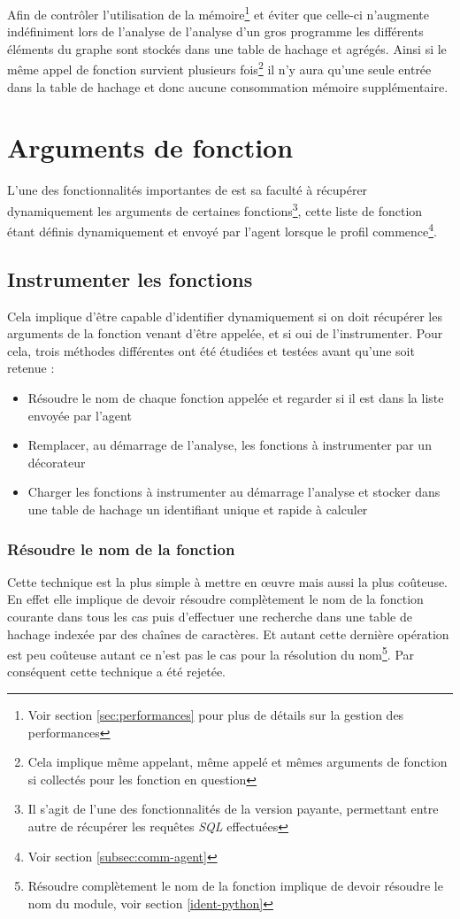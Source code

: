 \begin{note}
Afin de contrôler l'utilisation de la mémoire\footnote{Voir section \vref{sec:performances} pour plus de détails sur la gestion des performances} et éviter que celle-ci n'augmente indéfiniment lors de l'analyse de l'analyse d'un gros programme les différents éléments du graphe sont stockés dans une table de hachage et agrégés. Ainsi si le même appel de fonction survient plusieurs fois\footnote{Cela implique même appelant, même appelé et mêmes arguments de fonction si collectés pour les fonction en question} il n'y aura qu'une seule entrée dans la table de hachage et donc aucune consommation mémoire supplémentaire.
\end{note}

  \section{Arguments de fonction}
  \label{sec:fnargs}
L'une des fonctionnalités importantes de \Blackfire est sa faculté à récupérer dynamiquement les arguments de certaines fonctions\footnote{Il s'agit de l'une des fonctionnalités de la version payante, permettant entre autre de récupérer les requêtes \emph{SQL} effectuées}, cette liste de fonction étant définis dynamiquement et envoyé par l'agent lorsque le profil commence\footnote{Voir section \vref{subsec:comm-agent}}.

\subsection{Instrumenter les fonctions}
Cela implique d'être capable d'identifier dynamiquement si on doit récupérer les arguments de la fonction venant d'être appelée, et si oui de l'instrumenter. Pour cela, trois méthodes différentes ont été étudiées et testées avant qu'une soit retenue : 
\begin{itemize}
\item Résoudre le nom de chaque fonction appelée et regarder si il est dans la liste envoyée par l'agent
\item Remplacer, au démarrage de l'analyse, les fonctions à instrumenter par un décorateur
\item Charger les fonctions à instrumenter au démarrage l'analyse et stocker dans une table de hachage un identifiant unique et rapide à calculer
\end{itemize}

\subsubsection*{Résoudre le nom de la fonction}
Cette technique est la plus simple à mettre en œuvre mais aussi la plus coûteuse. En effet elle implique de devoir résoudre complètement le nom de la fonction courante dans tous les cas puis d'effectuer une recherche dans une table de hachage indexée par des chaînes de caractères. Et autant cette dernière opération est peu coûteuse autant ce n'est pas le cas pour la résolution du nom\footnote{Résoudre complètement le nom de la fonction implique de devoir résoudre le nom du module, voir section \vref{ident-python}}. Par conséquent cette technique a été rejetée.

